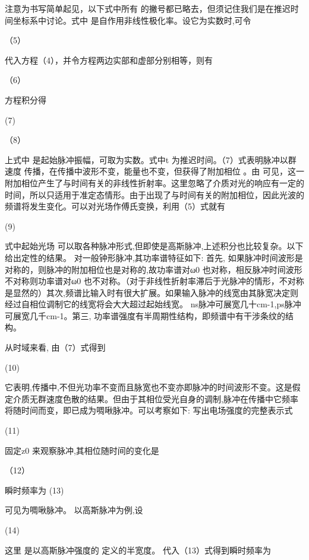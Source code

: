 注意为书写简单起见，以下式中所有  的撇号都已略去，但须记住我们是在推迟时间坐标系中讨论。式中  是自作用非线性极化率。设它为实数时,可令

                                                     （5）

 代入方程（4），并令方程两边实部和虚部分别相等，则有

                                   （6）

方程积分得

                    (7)                       

                      （8）

上式中 是起始脉冲振幅，可取为实数。式中t 为推迟时间。（7）式表明脉冲以群速度 传播，在传播中波形不变，能量也不变，但获得了附加相位 。由 可见，这一附加相位产生了与时间有关的非线性折射率。这里忽略了介质对光的响应有一定的时间，所以只适用于准定态情形。由于出现了与时间有关的附加相位，因此光波的频谱将发生变化。可以对光场作傅氏变换，利用（5）式就有

         (9)      

式中起始光场 可以取各种脉冲形式,但即使是高斯脉冲,上述积分也比较复杂。以下给出定性的结果。 对一般钟形脉冲,其功率谱特征如下: 首先, 如果脉冲时间波形是对称的，则脉冲的附加相位也是对称的,故功率谱对ω0 也对称，相反脉冲时间波形不对称则功率谱对ω0 也不对称。（对于非线性折射率滞后于光脉冲的情形，不对称是显然的）其次,频谱比输入时有很大扩展。如果输入脉冲的线宽由其脉宽决定则经过自相位调制它的线宽将会大大超过起始线宽。 ns脉冲可展宽几十cm-1,ps脉冲可展宽几千cm-1。第三, 功率谱强度有半周期性结构，即频谱中有干涉条纹的结构。

      从时域来看, 由（7）式得到

                                                    (10)

它表明,传播中,不但光功率不变而且脉宽也不变亦即脉冲的时间波形不变。这是假定介质无群速度色散的结果。但由于其相位受光自身的调制,脉冲在传播中它频率将随时间而变，即已成为啁啾脉冲。可以考察如下: 写出电场强度的完整表示式

                   (11)

固定z0 来观察脉冲,其相位随时间的变化是

                                              （12）

瞬时频率为                          (13)

可见为啁啾脉冲。 以高斯脉冲为例,设

                                                  (14)

这里 是以高斯脉冲强度的 定义的半宽度。 代入（13）式得到瞬时频率为


